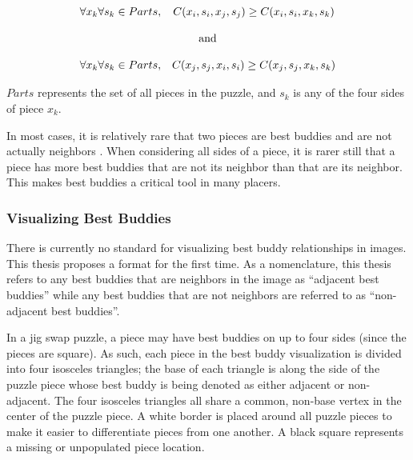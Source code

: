 \documentclass{report}
\begin{document}
\begin{equation} \label{eq:bestBuddyDefinition}
\begin{split}
\begin{matrix}
\forall{x_k} \forall{s_k} \in Parts, & C(x_i, s_i, x_j, s_j) \geq C(x_i, s_i, x_k, s_k)
\\
\\
\multicolumn{2}{c}{\textnormal{and}}
\\
\\
\forall{x_k} \forall{s_k} \in Parts, & C(x_j, s_j, x_i, s_i) \geq C(x_j, s_j, x_k, s_k)
\end{matrix}
\end{split}
\end{equation}

\noindent
$Parts$ represents the set of all pieces in the puzzle, and $s_k$ is any of the four sides of piece $x_k$.

In most cases, it is relatively rare that two pieces are best buddies and are not actually neighbors \cite{paikin2015}.  When considering all sides of a piece, it is rarer still that a piece has more best buddies that are not its neighbor than that are its neighbor.  This makes best buddies a critical tool in many placers.

\subsubsection{Visualizing Best Buddies}\label{sec:visualizingBestBuddies}

There is currently no standard for visualizing best buddy relationships in images.  This thesis proposes a format for the first time.  As a nomenclature, this thesis refers to any best buddies that are neighbors in the image as ``adjacent best buddies'' while any best buddies that are not neighbors are referred to as ``non-adjacent best buddies''.  

In a jig swap puzzle, a piece may have best buddies on up to four sides (since the pieces are square).  As such, each piece in the best buddy visualization is divided into four isosceles triangles; the base of each triangle is along the side of the puzzle piece whose best buddy is being denoted as either adjacent or non-adjacent.  The four isosceles triangles all share a common, non-base vertex in the center of the puzzle piece.  A white border is placed around all puzzle pieces to make it easier to differentiate pieces from one another.  A black square represents a missing or unpopulated piece location.
\end{document}
